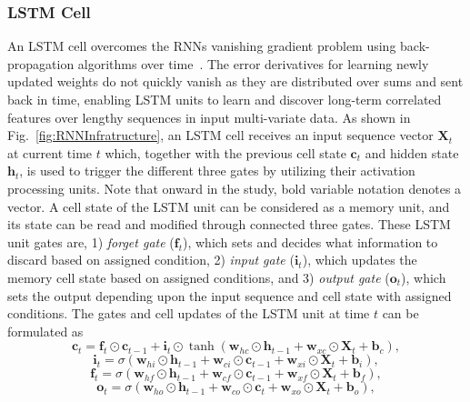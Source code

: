 \documentclass[10pt, conference]{IEEEtran}
\newcommand{\fakeparagraph}[1]{\vspace{.1mm}\noindent\textbf{#1}}
\newcommand{\fakepar}[1]{\fakeparagraph{#1}}
\begin{document}
\subsubsection{LSTM Cell}
An LSTM cell overcomes the RNNs vanishing gradient problem using back-propagation algorithms over time~\cite{LSTM}. The error derivatives for learning newly updated weights do not quickly vanish as they are distributed over sums and sent back in time, enabling LSTM units to learn and discover long-term correlated features over lengthy sequences in input multi-variate data.
As shown in Fig.~\ref{fig:RNNInfratructure}, an LSTM cell receives an input sequence vector $\mathbf{X}_t$ at current time $t$ which, together with the previous cell state $\mathbf{c}_t$ and hidden state $\mathbf{h}_t$, is used to trigger the different three gates by utilizing their activation processing units. Note that onward in the study, bold variable notation denotes a vector. A cell state of the LSTM unit can be considered as a memory unit, and its state can be read and modified through connected three gates. 
These LSTM unit gates are, 1) \textit{forget gate} ($\mathbf{f}_t$), which sets and decides what information to discard based on assigned condition, 2) \textit{input gate} ($\mathbf{i}_t$), which updates the memory cell state based on assigned conditions, and 3) \textit{output gate} ($\mathbf{o}_t$), which sets the output depending upon the input sequence and cell state with assigned conditions. 
The gates and cell updates of the LSTM unit at time $t$ can be formulated as 
\begin{equation*}\label{eq1}
{\mathbf{c}_t} = {\mathbf{f}_t} \odot {\mathbf{c}_{t - 1}} + {\mathbf{i}_t}\odot\tanh \left( {{\mathbf{w}_{hc}}\odot{\mathbf{h}_{t - 1}} + {\mathbf{w}_{xc}}\odot{\mathbf{X}_t} + {\mathbf{b}_c}} \right),
\end{equation*}
\begin{equation*}\label{eq2}
{\mathbf{i}_t} = \sigma \left( {{\mathbf{w}_{hi}}\odot{\mathbf{h}_{t - 1}} + {\mathbf{w}_{ci}}\odot{\mathbf{c}_{t - 1}} + {\mathbf{w}_{xi}}\odot{\mathbf{X}_t} + {\mathbf{b}_i}} \right),
\end{equation*}
\begin{equation*}\label{eq3}
{\mathbf{f}_t} = \sigma \left( {{\mathbf{w}_{hf}}\odot{\mathbf{h}_{t - 1}} + {\mathbf{w}_{cf}}\odot{\mathbf{c}_{t - 1}} + {\mathbf{w}_{xf}}\odot{\mathbf{X}_t} + {\mathbf{b}_f}} \right),
\end{equation*}
\begin{equation*}\label{eq4}
{\mathbf{o}_t} = \sigma \left( {{\mathbf{w}_{ho}}\odot{\mathbf{h}_{t - 1}} + {\mathbf{w}_{co}}\odot{\mathbf{c}_t} + {\mathbf{w}_{xo}}\odot{\mathbf{X}_t} + {\mathbf{b}_o}} \right),
\end{equation*}
\end{document}
